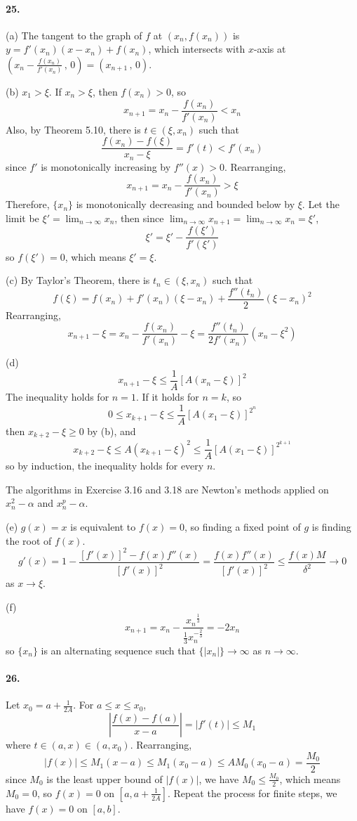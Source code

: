 \documentclass[a4paper]{article}
\begin{document}
\paragraph{25.}
(a)
The tangent to the graph of $f$ at $(x_n,f(x_n))$ is $y=f'(x_n)(x-x_n)+f(x_n)$, which intersects with $x$-axis at $\left(x_n-\frac{f(x_n)}{f'(x_n)}\,,\,0\right)=(x_{n+1}\,,\,0)$.
\medskip

(b)
$x_1>\xi$. If $x_n>\xi$, then $f(x_n)>0$, so
\[
x_{n+1}=x_n-\frac{f(x_n)}{f'(x_n)}<x_n
\]
Also, by Theorem 5.10, there is $t\in(\xi,x_n)$ such that
\[
\frac{f(x_n)-f(\xi)}{x_n-\xi}=f'(t)<f'(x_n)
\]
since $f'$ is monotonically increasing by $f''(x)>0$. Rearranging, 
\[
x_{n+1}=x_n-\frac{f(x_n)}{f'(x_n)}>\xi
\]
Therefore, $\{x_n\}$ is monotonically decreasing and bounded below by $\xi$. Let the limit be $\xi'=\lim_{n\to\infty}x_n$, then since $\lim_{n\to\infty}x_{n+1}=\lim_{n\to\infty}x_n=\xi'$,
\[
\xi'=\xi'-\frac{f(\xi')}{f'(\xi')}
\]
so $f(\xi')=0$, which means $\xi'=\xi$.
\medskip

(c)
By Taylor's Theorem, there is $t_n\in(\xi,x_n)$ such that
\[
f(\xi)=f(x_n)+f'(x_n)(\xi-x_n)+\frac{f''(t_n)}{2}(\xi-x_n)^2
\]
Rearranging,
\[
x_{n+1}-\xi=x_n-\frac{f(x_n)}{f'(x_n)}-\xi=\frac{f''(t_n)}{2f'(x_n)}(x_n-\xi^2)
\]

(d)
\[
x_{n+1}-\xi\leq\frac{1}{A}\left[A(x_n-\xi)\right]^2
\]
The inequality holds for $n=1$. If it holds for $n=k$, so
\[
0\leq x_{k+1}-\xi\leq\frac{1}{A}\left[A(x_1-\xi) \right]^{2^n}
\]
then $x_{k+2}-\xi\geq0$ by (b), and
\[
x_{k+2}-\xi\leq A(x_{k+1}-\xi)^2\leq\frac{1}{A}\left[A(x_1-\xi)\right]^{2^{k+1}}
\]
so by induction, the inequality holds for every $n$.

The algorithms in Exercise 3.16 and 3.18 are Newton's methods applied on $x_n^2-\alpha$ and $x_n^p-\alpha$.
\medskip

(e)
$g(x)=x$ is equivalent to $f(x)=0$, so finding a fixed point of $g$ is finding the root of $f(x)$.
\[
g'(x)=1-\frac{\left[f'(x) \right]^2-f(x)f''(x)}{\left[f'(x) \right]^2}=\frac{f(x)f''(x)}{\left[f'(x) \right]^2}\leq\frac{f(x)M}{\delta^2}\to0
\]
as $x\to\xi$.
\medskip

(f)
\[
x_{n+1}=x_n-\frac{{x_n}^{\frac{1}{3}}}{\frac{1}{3}x_n^{-\frac{2}{3}}}=-2x_n
\]
so $\{x_n\}$ is an alternating sequence such that $\{|x_n|\}\to\infty$ as $n\to\infty$.

\paragraph{26.}
Let $x_0=a+\frac{1}{2A}$. For $a\leq x\leq x_0$,
\[
\left|\frac{f(x)-f(a)}{x-a} \right|=\left|f'(t) \right|\leq M_1
\]
where $t\in(a,x)\in(a,x_0)$. Rearranging,
\[
|f(x)|\leq M_1(x-a)\leq M_1(x_0-a)\leq AM_0(x_0-a)=\frac{M_0}{2}
\]
since $M_0$ is the least upper bound of $|f(x)|$, we have $M_0\leq\frac{M_0}{2}$, which means $M_0=0$, so $f(x)=0$ on $[a,a+\frac{1}{2A}]$. Repeat the process for finite steps, we have $f(x)=0$ on $[a,b]$.
\end{document}
